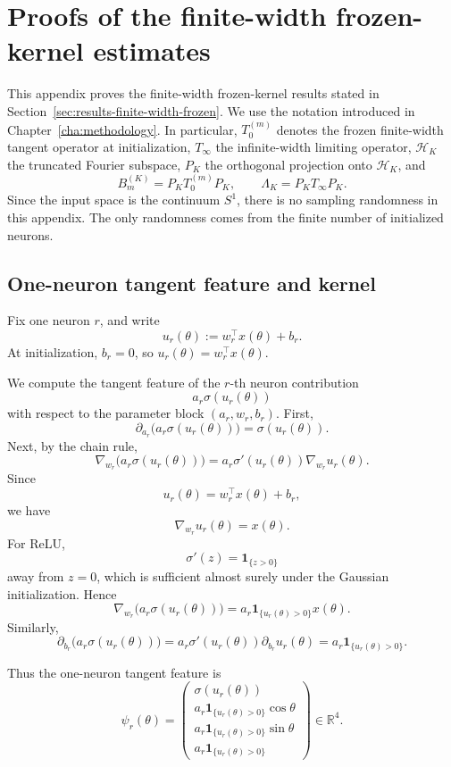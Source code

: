 \chapter{Proofs of the finite-width frozen-kernel estimates}
\label{app:finite-width-frozen-proofs}

This appendix proves the finite-width frozen-kernel results stated in
Section~\ref{sec:results-finite-width-frozen}. We use the notation introduced in
Chapter~\ref{cha:methodology}. In particular, \(T_0^{(m)}\) denotes the frozen finite-width
tangent operator at initialization, \(T_\infty\) the infinite-width limiting operator,
\(\mathcal H_K\) the truncated Fourier subspace, \(P_K\) the orthogonal projection onto
\(\mathcal H_K\), and
\[
	B_m^{(K)}=P_KT_0^{(m)}P_K,
	\qquad
	\Lambda_K=P_KT_\infty P_K.
\]
Since the input space is the continuum \(S^1\), there is no sampling randomness in this
appendix. The only randomness comes from the finite number of initialized neurons.

\section{One-neuron tangent feature and kernel}
\label{sec:app-finite-width-one-neuron}

Fix one neuron \(r\), and write
\[
	u_r(\theta):=w_r^\top x(\theta)+b_r.
\]
At initialization, \(b_r=0\), so \(u_r(\theta)=w_r^\top x(\theta)\).

We compute the tangent feature of the \(r\)-th neuron contribution
\[
	a_r\sigma(u_r(\theta))
\]
with respect to the parameter block \((a_r,w_r,b_r)\). First,
\[
	\partial_{a_r}\bigl(a_r\sigma(u_r(\theta))\bigr)
	=
	\sigma(u_r(\theta)).
\]
Next, by the chain rule,
\[
	\nabla_{w_r}\bigl(a_r\sigma(u_r(\theta))\bigr)
	=
	a_r\sigma'(u_r(\theta))\nabla_{w_r}u_r(\theta).
\]
Since
\[
	u_r(\theta)=w_r^\top x(\theta)+b_r,
\]
we have
\[
	\nabla_{w_r}u_r(\theta)=x(\theta).
\]
For ReLU,
\[
	\sigma'(z)=\mathbf 1_{\{z>0\}}
\]
away from \(z=0\), which is sufficient almost surely under the Gaussian initialization.
Hence
\[
	\nabla_{w_r}\bigl(a_r\sigma(u_r(\theta))\bigr)
	=
	a_r\mathbf 1_{\{u_r(\theta)>0\}}x(\theta).
\]
Similarly,
\[
	\partial_{b_r}\bigl(a_r\sigma(u_r(\theta))\bigr)
	=
	a_r\sigma'(u_r(\theta))\partial_{b_r}u_r(\theta)
	=
	a_r\mathbf 1_{\{u_r(\theta)>0\}}.
\]

Thus the one-neuron tangent feature is
\begin{equation}
	\psi_r(\theta)
	=
	\begin{pmatrix}
		\sigma(u_r(\theta))                        \\
		a_r\mathbf 1_{\{u_r(\theta)>0\}}\cos\theta \\
		a_r\mathbf 1_{\{u_r(\theta)>0\}}\sin\theta \\
		a_r\mathbf 1_{\{u_r(\theta)>0\}}
	\end{pmatrix}
	\in\mathbb R^4.
	\label{eq:app-finite-width-tangent-feature}
\end{equation}

